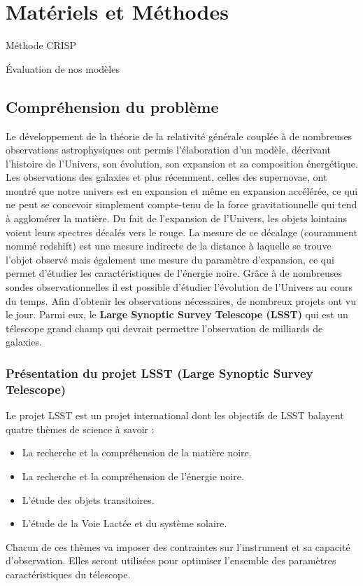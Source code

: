 \chapter{Matériels et Méthodes}

Méthode CRISP\cite{crisp}

Évaluation de nos modèles \cite{plasticc_team_2019_2539456}

\section{Compréhension du problème}
Le développement de la théorie de la relativité générale couplée à de nombreuses observations astrophysiques ont permis l'élaboration d'un modèle, décrivant l'histoire de l'Univers, son évolution, son expansion et sa composition énergétique.
Les observations des galaxies et plus récemment, celles des supernovae, ont montré que notre univers est en expansion et même en expansion accélérée, ce qui ne peut se concevoir simplement compte-tenu de la force gravitationnelle qui tend à agglomérer la matière.
Du fait de l'expansion de l'Univers, les objets lointains voient leurs spectres décalés vers le rouge.
\newline La mesure de ce décalage (couramment nommé redshift) est une mesure indirecte de la distance à laquelle se trouve l'objet observé mais également une mesure du paramètre d'expansion, ce qui permet d'étudier les caractéristiques de l'énergie noire. Grâce à de nombreuses sondes observationnelles il est possible d'étudier l'évolution de l'Univers au cours du temps.
Afin d'obtenir les observations nécessaires, de nombreux projets ont vu le jour. Parmi eux, le \textbf{Large Synoptic Survey Telescope (LSST)} qui est un télescope grand champ qui devrait permettre l'observation de milliards de galaxies.
\subsection{Présentation du projet LSST (Large Synoptic Survey Telescope)} 
Le projet LSST  est un projet international dont les objectifs de LSST balayent quatre thèmes de science à savoir :
\begin{itemize}
    \item  La recherche et la compréhension de la matière noire.
    \item La recherche et la compréhension de l'énergie noire.
    \item L'étude des objets transitoires.
    \item  L'étude de la Voie Lactée et du système solaire.
\end{itemize}
Chacun de ces thèmes va imposer des contraintes sur l'instrument et sa capacité d'observation.
Elles seront utilisées pour optimiser l'ensemble des paramètres caractéristiques du télescope.
